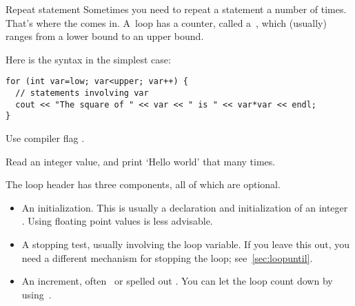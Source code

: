\begin{slide}{Repeat statement}
  \label{sl:for}
  Sometimes you need to repeat a statement a number of times. That's
  where the  comes in. A~loop has a counter, called
  a~, which (usually) ranges from a lower bound
  to an upper bound.

  Here is the syntax in the simplest case:
\begin{verbatim}
for (int var=low; var<upper; var++) {
  // statements involving var
  cout << "The square of " << var << " is " << var*var << endl;
}
\end{verbatim}
\begin{cnote}
Use compiler flag .
\end{cnote}
\end{slide}

\begin{exercise}
  \label{ex:manyhello}
  Read an integer value, and print `Hello world' that many times.
\end{exercise}

The loop header has three components, all of which are optional.
\begin{itemize}
\item An initialization. This is usually a declaration and
  initialization of an integer . Using
  floating point values is less advisable.
\item A stopping test, usually involving the loop variable. If you
  leave this out, you need a different mechanism for stopping the
  loop; see~\ref{sec:loopuntil}.
\item An increment, often~ or spelled out . You can let the loop count down by using~.
\end{itemize}

